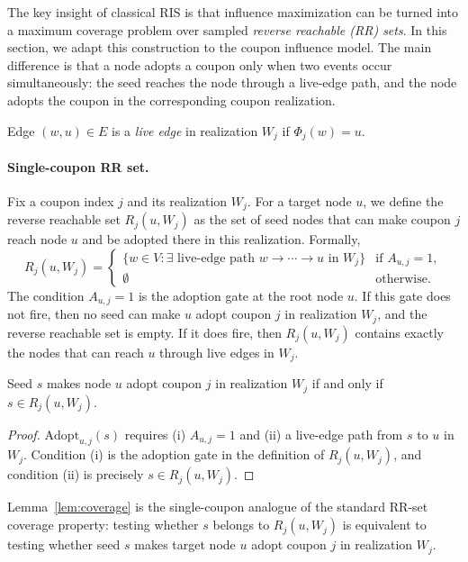 \documentclass[sigconf]{acmart}
\begin{document}
The key insight of classical RIS is that influence maximization can be
turned into a maximum coverage problem over sampled \emph{reverse
reachable (RR) sets}.
In this section, we adapt this construction to the coupon influence
model.
The main difference is that a node adopts a coupon only when two
events occur simultaneously: the seed reaches the node through a
live-edge path, and the node adopts the coupon in the corresponding
coupon realization.

\begin{definition}
Edge $(w,u) \in E$ is a \emph{live edge} in realization $W_j$ if\/
$\Phi_j(w)=u$.
\end{definition}

\paragraph{Single-coupon RR set.}
Fix a coupon index $j$ and its realization $W_j$.
For a target node $u$, we define the reverse reachable set
$R_j(u,W_j)$ as the set of seed nodes that can make coupon $j$ reach
node $u$ and be adopted there in this realization.
Formally,
\[
  R_j(u, W_j) =
  \begin{cases}
    \{w \in V : \exists \text{ live-edge path } w \to \cdots \to u
      \text{ in } W_j\} & \text{if } A_{u,j} = 1, \\
    \emptyset & \text{otherwise.}
  \end{cases}
\]
The condition $A_{u,j}=1$ is the adoption gate at the root node $u$.
If this gate does not fire, then no seed can make $u$ adopt coupon $j$
in realization $W_j$, and the reverse reachable set is empty.
If it does fire, then $R_j(u,W_j)$ contains exactly the nodes that can
reach $u$ through live edges in $W_j$.

\begin{lemma}
\label{lem:coverage}
Seed $s$ makes node $u$ adopt coupon $j$ in realization $W_j$ if and only
if $s \in R_j(u, W_j)$.
\end{lemma}

\begin{proof}
$\mathrm{Adopt}_{u,j}(s)$ requires (i) $A_{u,j} = 1$ and (ii) a
live-edge path from $s$ to $u$ in $W_j$.
Condition (i) is the adoption gate in the definition of $R_j(u,W_j)$,
and condition (ii) is precisely $s \in R_j(u, W_j)$.
\end{proof}

Lemma~\ref{lem:coverage} is the single-coupon analogue of the standard
RR-set coverage property: testing whether $s$ belongs to
$R_j(u,W_j)$ is equivalent to testing whether seed $s$ makes target
node $u$ adopt coupon $j$ in realization $W_j$.
\end{document}

